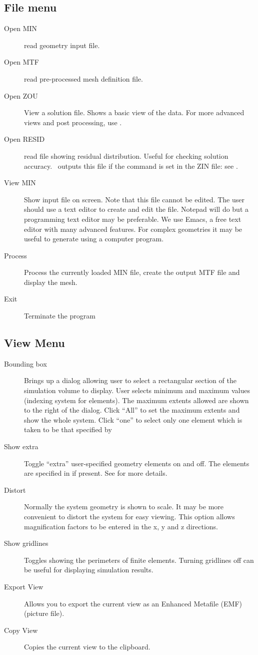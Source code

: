 \documentclass[a4paper,twoside,11pt]{book}
\begin{document}
\subsection{File menu}
\begin{description}
  \item[Open MIN] read geometry input file.
  \item[Open MTF] read pre-processed mesh definition file.
  \item[Open ZOU] View a solution file. Shows a basic view of the
    data. For more advanced views and post processing, use \zpp.
  \item[Open RESID] read file showing residual distribution. Useful
    for checking solution accuracy. \zinc\ outputs this file if the
     command is set in the ZIN file: see .
  \item[View MIN] Show input file on screen. Note that this file
    cannot be edited. The user should use a text editor to create and edit the
    file. Notepad will do but a programming text editor may be
    preferable. We use Emacs, a free text editor with many advanced
    features. For complex geometries it may be useful to generate
     using a computer program.
  \item[Process] Process the currently loaded MIN file, create the
    output MTF file and display the mesh.
  \item[Exit] Terminate the program
\end{description}

\subsection{View Menu}
\begin{description}
  \item[Bounding box] Brings up a dialog allowing user to select a
    rectangular section of the simulation volume to display. User
    selects minimum and maximum  values (indexing system
    for elements). The maximum extents allowed are shown to the right
    of the dialog. Click ``All'' to set the maximum extents and show
    the whole system. Click ``one'' to select only one element which
    is taken to be that specified by 
  \item[Show extra] Toggle ``extra'' user-specified geometry elements
    on and off. The elements are specified in  if
    present. See  for more details.
  \item[Distort] Normally the system geometry is shown to scale. It
    may be more convenient to distort the system for easy
    viewing. This option allows magnification factors to be entered in
    the x, y and z directions.
  \item[Show gridlines] Toggles showing the perimeters of finite
    elements. Turning gridlines off can be useful for displaying
    simulation results.
  \item[Export View] Allows you to export the current view as an
    Enhanced Metafile (EMF) (picture file).
  \item[Copy View] Copies the current view to the clipboard.
\end{description}
\end{document}
